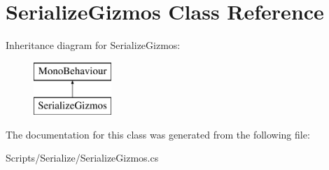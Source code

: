 \hypertarget{class_serialize_gizmos}{}\section{Serialize\+Gizmos Class Reference}
\label{class_serialize_gizmos}
Inheritance diagram for Serialize\+Gizmos\+:\begin{figure}[H]
\begin{center}
\leavevmode
\includegraphics[height=2.000000cm]{class_serialize_gizmos}
\end{center}
\end{figure}


The documentation for this class was generated from the following file\+:\begin{DoxyCompactItemize}
\item 
Scripts/\+Serialize/Serialize\+Gizmos.\+cs\end{DoxyCompactItemize}
